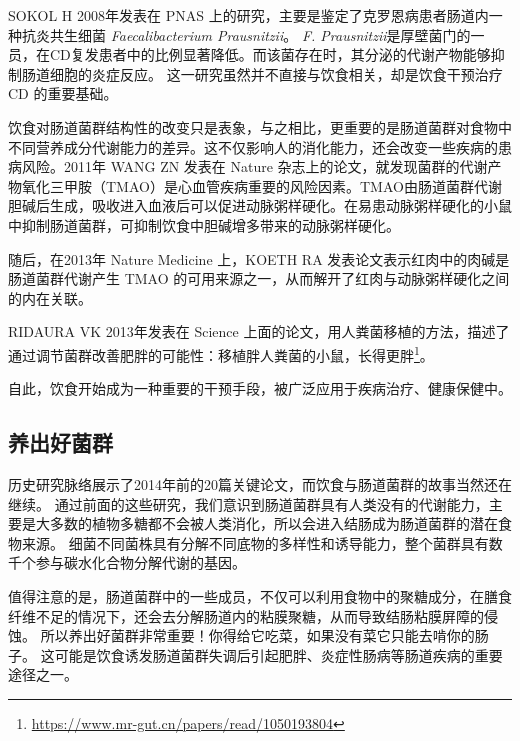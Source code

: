 \documentclass[]{ctexbook}
\renewcommand{\href}[2]{#2\footnote{\url{#1}}}
\begin{document}
SOKOL H 2008年发表在 PNAS 上的研究，主要是鉴定了克罗恩病患者肠道内一种抗炎共生细菌 \emph{Faecalibacterium Prausnitzii}\citep{sokolFaecalibacteriumPrausnitziiAntiinflammatory2008}。
\emph{F. Prausnitzii}是厚壁菌门的一员，在CD复发患者中的比例显著降低。而该菌存在时，其分泌的代谢产物能够抑制肠道细胞的炎症反应。
这一研究虽然并不直接与饮食相关，却是饮食干预治疗 CD 的重要基础。

饮食对肠道菌群结构性的改变只是表象，与之相比，更重要的是肠道菌群对食物中不同营养成分代谢能力的差异。这不仅影响人的消化能力，还会改变一些疾病的患病风险。2011年 WANG ZN 发表在 Nature 杂志上的论文，就发现菌群的代谢产物氧化三甲胺（TMAO）是心血管疾病重要的风险因素\citep{wangGutFloraMetabolism2011}。TMAO由肠道菌群代谢胆碱后生成，吸收进入血液后可以促进动脉粥样硬化。在易患动脉粥样硬化的小鼠中抑制肠道菌群，可抑制饮食中胆碱增多带来的动脉粥样硬化。

随后，在2013年 Nature Medicine 上，KOETH RA 发表论文表示红肉中的肉碱是肠道菌群代谢产生 TMAO 的可用来源之一\citep{koethIntestinalMicrobiotaMetabolism2013}，从而解开了红肉与动脉粥样硬化之间的内在关联。

RIDAURA VK 2013年发表在 Science 上面的论文，用人粪菌移植的方法，描述了通过调节菌群改善肥胖的可能性\citep{ridauraGutMicrobiotaTwins2013a}：\href{https://www.mr-gut.cn/papers/read/1050193804}{移植胖人粪菌的小鼠，长得更胖}。

自此，饮食开始成为一种重要的干预手段，被广泛应用于疾病治疗、健康保健中。

\hypertarget{ux517bux51faux597dux83ccux7fa4}{%
\subsection{养出好菌群}\label{ux517bux51faux597dux83ccux7fa4}}

历史研究脉络展示了2014年前的20篇关键论文，而饮食与肠道菌群的故事当然还在继续。
通过前面的这些研究，我们意识到肠道菌群具有人类没有的代谢能力，主要是大多数的植物多糖都不会被人类消化，所以会进入结肠成为肠道菌群的潜在食物来源。
细菌不同菌株具有分解不同底物的多样性和诱导能力，整个菌群具有数千个参与碳水化合物分解代谢的基因\citep{farrellImportanceFeedingYour2019}。

值得注意的是，肠道菌群中的一些成员，不仅可以利用食物中的聚糖成分，在膳食纤维不足的情况下，还会去分解肠道内的粘膜聚糖，从而导致结肠粘膜屏障的侵蚀。
所以养出好菌群非常重要！你得给它吃菜，如果没有菜它只能去啃你的肠子\citep{desaiDietaryFiberDeprivedGut2016}。
这可能是饮食诱发肠道菌群失调后引起肥胖、炎症性肠病等肠道疾病的重要途径之一。
\end{document}
